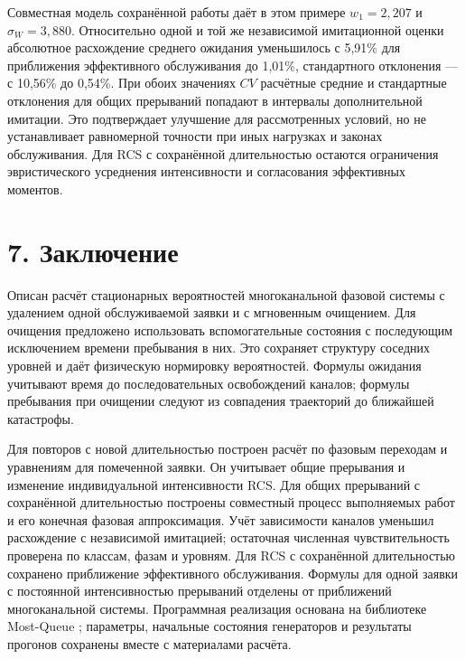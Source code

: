 Совместная модель сохранённой работы даёт в этом примере \(w_1=2{,}207\) и \(\sigma_W=3{,}880.\) Относительно одной и той же независимой имитационной оценки абсолютное расхождение среднего ожидания уменьшилось с 5{,}91\% для приближения эффективного обслуживания до 1{,}01\%, стандартного отклонения --- с 10{,}56\% до 0{,}54\%. При обоих значениях \(CV\) расчётные средние и стандартные отклонения для общих прерываний попадают в интервалы дополнительной имитации. Это подтверждает улучшение для рассмотренных условий, но не устанавливает равномерной точности при иных нагрузках и законах обслуживания. Для RCS с сохранённой длительностью остаются ограничения эвристического усреднения интенсивности и согласования эффективных моментов.

\FloatBarrier
\section*{7. Заключение}
Описан расчёт стационарных вероятностей многоканальной фазовой системы с удалением одной обслуживаемой заявки и с мгновенным очищением. Для очищения предложено использовать вспомогательные состояния с последующим исключением времени пребывания в них. Это сохраняет структуру соседних уровней и даёт физическую нормировку вероятностей. Формулы ожидания учитывают время до последовательных освобождений каналов; формулы пребывания при очищении следуют из совпадения траекторий до ближайшей катастрофы.

Для повторов с новой длительностью построен расчёт по фазовым переходам и уравнениям для помеченной заявки. Он учитывает общие прерывания и изменение индивидуальной интенсивности RCS. Для общих прерываний с сохранённой длительностью построены совместный процесс выполняемых работ и его конечная фазовая аппроксимация. Учёт зависимости каналов уменьшил расхождение с независимой имитацией; остаточная численная чувствительность проверена по классам, фазам и уровням. Для RCS с сохранённой длительностью сохранено приближение эффективного обслуживания. Формулы для одной заявки с постоянной интенсивностью прерываний отделены от приближений многоканальной системы. Программная реализация основана на библиотеке Most-Queue \cite{mostqueue2026}; параметры, начальные состояния генераторов и результаты прогонов сохранены вместе с материалами расчёта.


